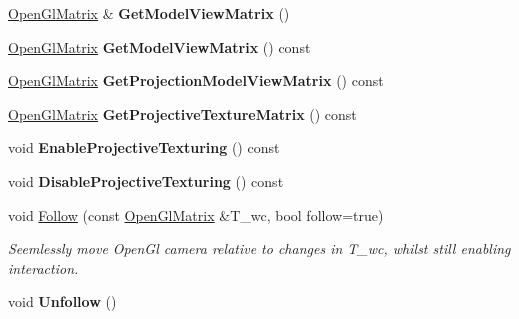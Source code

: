 \begin{DoxyCompactItemize}
\item 
\hyperlink{structpangolin_1_1_open_gl_matrix}{Open\+Gl\+Matrix} \& {\bfseries Get\+Model\+View\+Matrix} ()\hypertarget{classpangolin_1_1_open_gl_render_state_adc5fcd433b7fabbea30937c0d1b7b182}{}\label{classpangolin_1_1_open_gl_render_state_adc5fcd433b7fabbea30937c0d1b7b182}

\item 
\hyperlink{structpangolin_1_1_open_gl_matrix}{Open\+Gl\+Matrix} {\bfseries Get\+Model\+View\+Matrix} () const \hypertarget{classpangolin_1_1_open_gl_render_state_a444904b1920f655284d2a21da6318480}{}\label{classpangolin_1_1_open_gl_render_state_a444904b1920f655284d2a21da6318480}

\item 
\hyperlink{structpangolin_1_1_open_gl_matrix}{Open\+Gl\+Matrix} {\bfseries Get\+Projection\+Model\+View\+Matrix} () const \hypertarget{classpangolin_1_1_open_gl_render_state_a2d81641b296bf2b0df40477d5ab400d0}{}\label{classpangolin_1_1_open_gl_render_state_a2d81641b296bf2b0df40477d5ab400d0}

\item 
\hyperlink{structpangolin_1_1_open_gl_matrix}{Open\+Gl\+Matrix} {\bfseries Get\+Projective\+Texture\+Matrix} () const \hypertarget{classpangolin_1_1_open_gl_render_state_ae2ff80fe8dbdf8b9de6783bca29b5a1b}{}\label{classpangolin_1_1_open_gl_render_state_ae2ff80fe8dbdf8b9de6783bca29b5a1b}

\item 
void {\bfseries Enable\+Projective\+Texturing} () const \hypertarget{classpangolin_1_1_open_gl_render_state_a9bf003a79d90e8f97d82808ef0d04a16}{}\label{classpangolin_1_1_open_gl_render_state_a9bf003a79d90e8f97d82808ef0d04a16}

\item 
void {\bfseries Disable\+Projective\+Texturing} () const \hypertarget{classpangolin_1_1_open_gl_render_state_a73dd458bbc371c03ef2283df1a5fd4bb}{}\label{classpangolin_1_1_open_gl_render_state_a73dd458bbc371c03ef2283df1a5fd4bb}

\item 
void \hyperlink{classpangolin_1_1_open_gl_render_state_a3548ff9be0002e6adfcf5d3350b31529}{Follow} (const \hyperlink{structpangolin_1_1_open_gl_matrix}{Open\+Gl\+Matrix} \&T\+\_\+wc, bool follow=true)\hypertarget{classpangolin_1_1_open_gl_render_state_a3548ff9be0002e6adfcf5d3350b31529}{}\label{classpangolin_1_1_open_gl_render_state_a3548ff9be0002e6adfcf5d3350b31529}

\begin{DoxyCompactList}\small\item\em Seemlessly move Open\+Gl camera relative to changes in T\+\_\+wc, whilst still enabling interaction. \end{DoxyCompactList}\item 
void {\bfseries Unfollow} ()\hypertarget{classpangolin_1_1_open_gl_render_state_aac2a2e86117a88e7084bfac1153daa66}{}\label{classpangolin_1_1_open_gl_render_state_aac2a2e86117a88e7084bfac1153daa66}


\end{DoxyCompactItemize}

